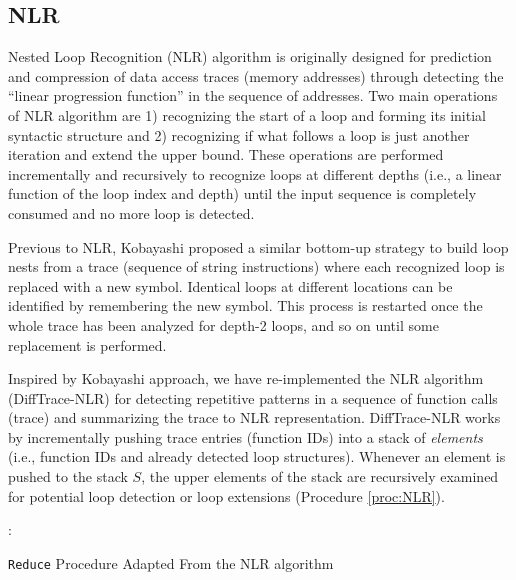 
\subsection{NLR}
\label{subsec:algo-nlr}
Nested Loop Recognition (NLR) algorithm \cite{Ketterlin-nlr} is originally designed for prediction and compression of data access traces (memory addresses) through detecting the ``linear progression function'' in the sequence of addresses.
%
Two main operations of NLR algorithm are 1) recognizing the start of a loop and forming its initial syntactic structure and 2) recognizing if what follows a loop is just another iteration and extend the upper bound. 
%
These operations are performed incrementally and recursively to recognize loops at different depths (i.e., a linear function of the loop index and depth) until the input sequence is completely consumed and no more loop is detected.
%

Previous to NLR, Kobayashi \cite{kobayashi-84} proposed a similar bottom-up strategy to build loop nests from a trace (sequence of string instructions) where each recognized loop is replaced with a new symbol.
%
Identical loops at different locations can be identified by remembering the new symbol.
%
This process is restarted once the whole trace has been analyzed for depth-2 loops, and so on until some replacement is performed.
%

Inspired by Kobayashi approach, we have re-implemented the NLR algorithm (DiffTrace-NLR) for detecting repetitive patterns in a sequence of function calls (trace) and summarizing the trace to NLR representation.
%
DiffTrace-NLR works by incrementally pushing trace entries (function IDs) into a stack of \textit{elements} (i.e., function IDs and already detected loop structures).
%
Whenever an element is pushed to the stack $S$, the upper elements of the stack are recursively examined for potential loop detection or loop extensions (Procedure \ref{proc:NLR}). 



\begin{algorithm}[]
 \DontPrintSemicolon
 :{\\
 \Indp
 }

 \caption{\texttt{Reduce} Procedure Adapted From the NLR algorithm }
 \label{proc:NLR}
\end{algorithm}

